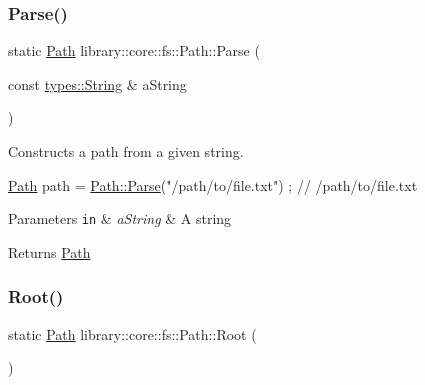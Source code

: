 \subsubsection{\texorpdfstring{Parse()}{Parse()}}
{\footnotesize\ttfamily static \hyperlink{classlibrary_1_1core_1_1fs_1_1_path}{Path} library\+::core\+::fs\+::\+Path\+::\+Parse (\begin{DoxyParamCaption}\item[{const \hyperlink{classlibrary_1_1core_1_1types_1_1_string}{types\+::\+String} \&}]{a\+String }\end{DoxyParamCaption})\hspace{0.3cm}{\ttfamily [static]}}



Constructs a path from a given string. 


\begin{DoxyCode}
\hyperlink{classlibrary_1_1core_1_1fs_1_1_path_aaba9a8e0153813f08f78f1c3275734a4}{Path} path = \hyperlink{classlibrary_1_1core_1_1fs_1_1_path_aebf5bd3af83e0b7376616e146f3e55df}{Path::Parse}(\textcolor{stringliteral}{"/path/to/file.txt"}) ; \textcolor{comment}{// /path/to/file.txt}
\end{DoxyCode}



\begin{DoxyParams}[1]{Parameters}
\mbox{\tt in}  & {\em a\+String} & A string \\
\hline
\end{DoxyParams}
\begin{DoxyReturn}{Returns}
\hyperlink{classlibrary_1_1core_1_1fs_1_1_path}{Path} 
\end{DoxyReturn}
\mbox{\label{classlibrary_1_1core_1_1fs_1_1_path_aa7276f3f578b7ebc40bb0fba7e9c2750}} 
\subsubsection{\texorpdfstring{Root()}{Root()}}
{\footnotesize\ttfamily static \hyperlink{classlibrary_1_1core_1_1fs_1_1_path}{Path} library\+::core\+::fs\+::\+Path\+::\+Root (\begin{DoxyParamCaption}{ }\end{DoxyParamCaption})\hspace{0.3cm}{\ttfamily [static]}}



